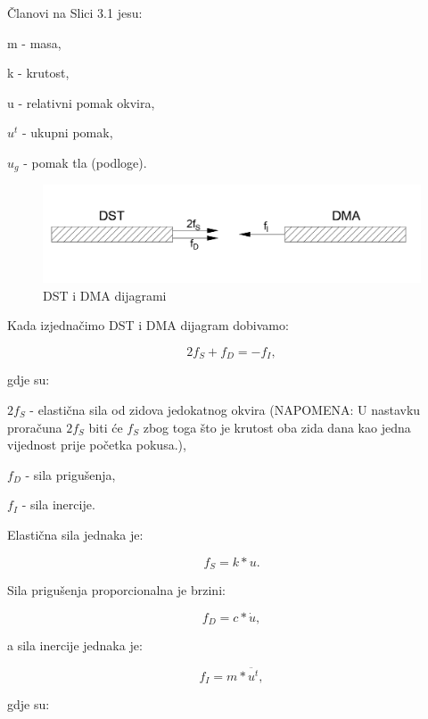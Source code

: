 \documentclass[12pt]{book}
\begin{document}
\newpage

Članovi na Slici 3.1 jesu:

m - masa,

k - krutost,

u - relativni pomak okvira,

$u^t$ - ukupni pomak,

$u_g$ - pomak tla (podloge).


\begin{figure}[h]
	\centering
	\includegraphics[width=1\linewidth]{Slike/screenshot002}
	\caption{DST i DMA dijagrami}
	\label{fig:screenshot002}
\end{figure}

Kada izjednačimo DST i DMA dijagram dobivamo:

\begin{equation}\label{Jednadžba 3.1}
	2f_S + f_D = - f_I,
\end{equation}

gdje su:

$2f_S$ - elastična sila od zidova jedokatnog okvira (NAPOMENA: U nastavku proračuna $2f_S$ biti će $f_S$ zbog toga što je krutost oba zida dana kao jedna vijednost prije početka pokusa.),

$f_D$ - sila prigušenja,

$f_I$ - sila inercije.

Elastična sila jednaka je:

\begin{equation}\label{Jednadzba 3.2}
	f_S = k*u.
\end{equation}

Sila prigušenja proporcionalna je brzini:

\begin{equation}\label{Jednadzba 3.3}
	f_D = c*\dot{u},
\end{equation}

a sila inercije jednaka je:

\begin{equation}\label{Jednadzba 3.4}
	f_I = m * \ddot{u^t},
\end{equation}

gdje su:
\end{document}
